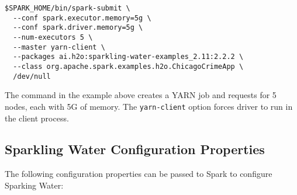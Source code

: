 \begin{lstlisting}[style=Bash]
$SPARK_HOME/bin/spark-submit \ 
  --conf spark.executor.memory=5g \
  --conf spark.driver.memory=5g \
  --num-executors 5 \
  --master yarn-client \
  --packages ai.h2o:sparkling-water-examples_2.11:2.2.2 \
  --class org.apache.spark.examples.h2o.ChicagoCrimeApp \
  /dev/null
\end{lstlisting}

The command in the example above creates a YARN job and requests for 5 nodes, each with 5G of memory. The \texttt{yarn-client} option forces driver to run in the client process.

\newpage

\subsection{Sparkling Water Configuration Properties}

The following configuration properties can be passed to Spark to configure Sparking Water:

